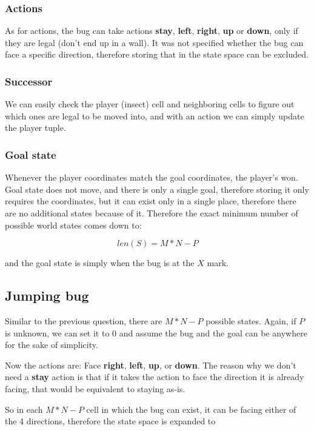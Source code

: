 \documentclass{homework}
\begin{document}
\subsubsection{Actions}
As for actions, the bug can take actions \textbf{stay}, \textbf{left}, \textbf{right}, \textbf{up} or \textbf{down}, only if they are legal (don't end up in a wall). It was not specified whether the bug can face a specific direction, therefore storing that in the state space can be excluded.

\subsubsection{Successor}
We can easily check the player (insect) cell and neighboring cells to figure out which ones are legal to be moved into, and with an action we can simply update the player tuple.

\subsubsection{Goal state}
Whenever the player coordinates match the goal coordinates, the player's won. Goal state does not move, and there is only a single goal, therefore storing it only requires the coordinates, but it can exist only in a single place, therefore there are no additional states because of it. Therefore the exact minimum number of possible world states comes down to:

\begin{equation*}
    len(S) = M * N - P
\end{equation*}

and the goal state is simply when the bug is at the $X$ mark.


\subsection{Jumping bug}
Similar to the previous question, there are $M * N - P$ possible states. Again, if $P$ is unknown, we can set it to 0 and assume the bug and the goal can be anywhere for the sake of simplicity.

Now the actions are: Face \textbf{right}, \textbf{left}, \textbf{up}, or \textbf{down}. The reason why we don't need a \textbf{stay} action is that if it takes the action to face the direction it is already facing, that would be equivalent to staying as-is.

So in each $M * N - P$ cell in which the bug can exist, it can be facing either of the 4 directions, therefore the state space is expanded to
\end{document}
